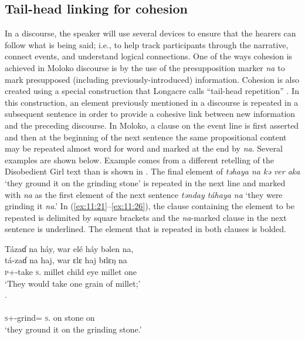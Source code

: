 \subsection{Tail-head linking for cohesion}\label{sec:11.1.3}
\hypertarget{RefHeading1213221525720847}{}
In a discourse, the speaker will use several devices to ensure that the hearers can follow what is being said; i.e., to help track participants through the narrative, connect events, and understand logical connections. One of the ways cohesion is achieved in Moloko discourse is by the use of the presupposition marker \textit{na} to mark presupposed (including previously-introduced) information. Cohesion is also created using a special construction that Longacre calls “tail-head repetition” \citep[204]{Longacre1976}. In this construction, an element previously mentioned in a discourse is repeated in a subsequent sentence in order to provide a cohesive link between new information and the preceding discourse. In Moloko, a clause on the event line is first asserted and then at the beginning of the next sentence the same propositional content may be repeated almost word for word and marked at the end by \textit{na}. Several examples are shown below. Example  comes from a different retelling of the Disobedient Girl text than is shown in . The final element of \textit{təhaya na kə ver aka} ‘they ground it on the grinding stone’ is repeated in the next line and marked with \textit{na} as the first element of the next sentence \textit{tənday táhaya na} ‘they were grinding it \textit{na}.’ In (\ref{ex:11:21}--\ref{ex:11:26}), the clause containing the element to be repeated is delimited by square brackets and the \textit{na}{}-marked clause in the next sentence is underlined. The element that is repeated in both clauses is bolded. 

\ea \label{ex:11:21}
Tázaɗ  na  háy,  war  elé  háy  bəlen  na,\\  
\gll  tá-zaɗ  na  haj,  war ɛlɛ   haj  bɪlɛŋ  na \\       
      \textsc{p}+{\IFV}-take  \textsc{s}.{\DO}  millet  child  eye   millet  one {\PSP} \\         
\glt ‘They would take one grain of millet;’\\
\clearpage
{}.\\  
\gll [\textbf{t\'ə-h}\textbf{=aja}  na kə  vɛr  aka] \\
     \textsc{s}+{\IFV}-grind={\PLU}   \textsc{s}.{\DO} on stone  on\\
\glt ‘they ground it on the grinding stone.’\\

